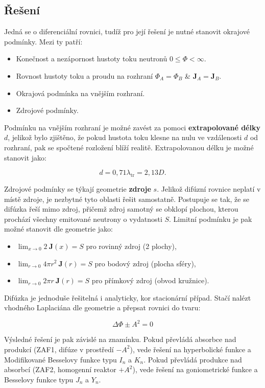 \subsection{Řešení}

Jedná se o diferenciální rovnici, tudíž pro její řešení je nutné stanovit okrajové podmínky. Mezi ty patří:

\begin{itemize}
    \item Konečnost a nezápornost hustoty toku neutronů $0 \leq \Phi < \infty $.
    \item Rovnost hustoty toku a proudu na rozhraní $\Phi_A = \Phi_B$ \& $\textbf{J}_A = \textbf{J}_B$.
    \item Okrajová podmínka na vnějším rozhraní.
    \item Zdrojové podmínky.
\end{itemize}

Podmínku na vnějším rozhraní je možné zavést za pomoci \textbf{extrapolované délky} $d$, jelikož bylo zjištěno, že pokud hustota toku klesne na nulu ve vzdálenosti $d$ od rozhraní, pak se spočtené rozložení blíží realitě. Extrapolovanou délku je možné stanovit jako:

$$ d = 0,71 \lambda_\text{tr} = 2,13 D. $$

Zdrojové podmínky se týkají geometrie \textbf{zdroje} $s$. Jelikož difúzní rovnice neplatí v místě zdroje, je nezbytné tyto oblasti řešit samostatně. Postupuje se tak, že se difúzka řeší mimo zdroj, přičemž zdroj samotný se obklopí plochou, kterou prochází všechny emitované neutrony o vydatnosti $S$. Limitní podmínku je pak možné stanovit dle geometrie jako:

\begin{itemize}
    \item $ \lim_{x \to 0} 2 \: \textbf{J}(x) = S $ pro rovinný zdroj (2 plochy),
    \item $ \lim_{r \to 0} 4 \pi r^2 \: \textbf{J}(r) = S $ pro bodový zdroj (plocha sféry),
    \item $ \lim_{r \to 0} 2 \pi r \: \textbf{J}(r) = S $ pro přímkový zdroj (obvod kružnice).
\end{itemize}

Difúzka je jednoduše řešitelná i analyticky, kor stacionární případ. Stačí nalézt vhodného Laplaciána dle geometrie a přepsat rovnici do tvaru:

$$ \Delta \Phi \pm A^2 = 0 $$

Výsledné řešení je pak závislé na znamínku. Pokud převládá absorbce nad produkcí (ZAF1, difúze v prostředí $ - A^2$), vede řešení na hyperbolické funkce a Modifikované Besselovy funkce typu $I_n$ a $K_n$. Pokud převládá produkce nad absorbcí (ZAF2, homogenní reaktor $ + A^2$), vede řešení na goniometrické funkce a Besselovy funkce typu $J_n$ a $Y_n$.

